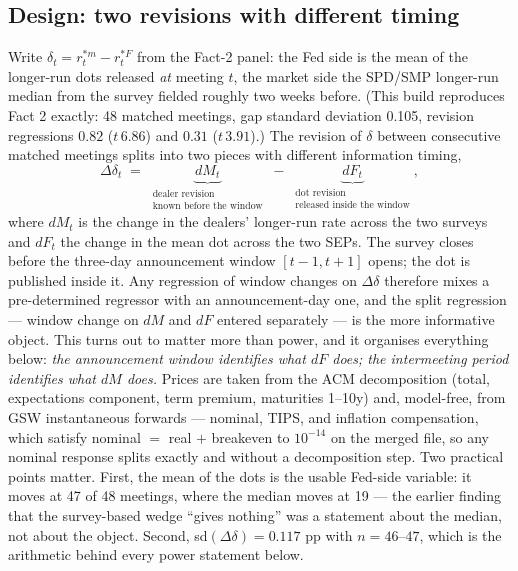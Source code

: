 \documentclass[11pt]{article}
\begin{document}
\subsection{Design: two revisions with different timing}
\label{sec:test-design}
Write $\delta_t = r^{*m}_t - r^{*F}_t$ from the Fact-2 panel: the Fed side is
the mean of the longer-run dots released \emph{at} meeting $t$, the market side
the SPD/SMP longer-run median from the survey fielded roughly two weeks
before. (This build reproduces Fact 2 exactly: 48 matched meetings, gap
standard deviation 0.105, revision regressions $0.82$ ($t\,6.86$) and $0.31$
($t\,3.91$).) The revision of $\delta$ between consecutive matched meetings
splits into two pieces with different information timing,
\[
\Delta\delta_t \;=\; \underbrace{dM_t}_{\substack{\text{dealer revision}\\ \text{known before the window}}}
\;-\; \underbrace{dF_t}_{\substack{\text{dot revision}\\ \text{released inside the window}}},
\]
where $dM_t$ is the change in the dealers' longer-run rate across the two
surveys and $dF_t$ the change in the mean dot across the two SEPs. The survey
closes before the three-day announcement window $[t-1,t+1]$ opens; the dot is
published inside it. Any regression of window changes on $\Delta\delta$
therefore mixes a pre-determined regressor with an announcement-day one, and
the split regression --- window change on $dM$ and $dF$ entered separately ---
is the more informative object. This turns out to matter more than power, and
it organises everything below: \emph{the announcement window identifies what
$dF$ does; the intermeeting period identifies what $dM$ does.}
Prices are taken from the ACM decomposition (total, expectations component,
term premium, maturities 1--10y) and, model-free, from GSW instantaneous
forwards --- nominal, TIPS, and inflation compensation, which satisfy
nominal $=$ real $+$ breakeven to $10^{-14}$ on the merged file, so any nominal
response splits exactly and without a decomposition step. Two practical points
matter. First, the mean of the dots is the usable Fed-side variable: it moves
at 47 of 48 meetings, where the median moves at 19 --- the earlier finding
that the survey-based wedge ``gives nothing'' was a statement about the median,
not about the object. Second, sd$(\Delta\delta)=0.117$ pp with $n=46$--$47$,
which is the arithmetic behind every power statement below.
\end{document}
